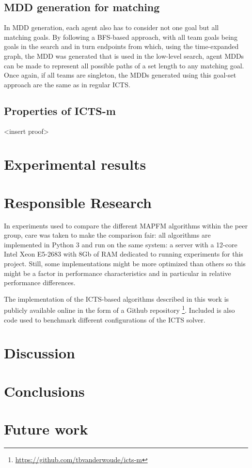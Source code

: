 \documentclass[english]{article}
\begin{document}
	\subsection{MDD generation for matching}
	In MDD generation, each agent also has to consider not one goal but all matching goals. By following a BFS-based approach, with all team goals being goals in the search and in turn endpoints from which, using the time-expanded graph, the MDD was generated that is used in the low-level search, agent MDDs can be made to represent all possible paths of a set length to any matching goal. Once again, if all teams are singleton, the MDDs generated using this goal-set approach are the same as in regular ICTS.
	
	\subsection{Properties of ICTS-m}
	<insert proof>
	\section{Experimental results}
	\section{Responsible Research}
	In experiments used to compare the different MAPFM algorithms within the peer group, care was taken to make the comparison fair: all algorithms are implemented in Python 3 and run on the same system: a server with a 12-core Intel Xeon E5-2683 with 8Gb of RAM dedicated to running experiments for this project. Still, some implementations might be more optimized than others so this might be a factor in performance characteristics and in particular in relative performance differences.
	
	The implementation of the ICTS-based algorithms described in this work is publicly available online in the form of a Github repository \footnote{\url{https://github.com/tbvanderwoude/icts-m}}. Included is also code used to benchmark different configurations of the ICTS solver.
	
	\section{Discussion}
	\section{Conclusions}
	\section{Future work}
	\printbibliography
	
\end{document}
